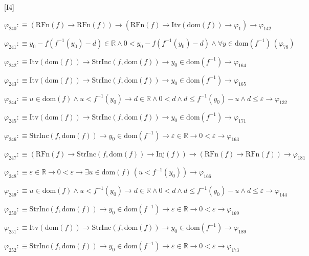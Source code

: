 \begin{fullproof}{[I4]}
\begin{abbrevlist}
\item $\varphi_{240} :\equiv (\mathrm{RFn}(f) \to \mathrm{RFn}(f)) \to (\mathrm{RFn}(f) \to \mathrm{Itv}(\mathrm{dom}(f)) \to \varphi_{1}) \to \varphi_{142}$
\item $\varphi_{241} :\equiv y_{0} - f(f^{-1}(y_{0}) - d) \in \mathbb{R} \land 0 < y_{0} - f(f^{-1}(y_{0}) - d) \land \forall y \in \mathrm{dom}(f^{-1})\,(\varphi_{78})$
\item $\varphi_{242} :\equiv \mathrm{Itv}(\mathrm{dom}(f)) \to \mathrm{StrInc}(f,\mathrm{dom}(f)) \to y_{0} \in \mathrm{dom}(f^{-1}) \to \varphi_{164}$
\item $\varphi_{243} :\equiv \mathrm{Itv}(\mathrm{dom}(f)) \to \mathrm{StrInc}(f,\mathrm{dom}(f)) \to y_{0} \in \mathrm{dom}(f^{-1}) \to \varphi_{165}$
\item $\varphi_{244} :\equiv u \in \mathrm{dom}(f) \land u < f^{-1}(y_{0}) \to d \in \mathbb{R} \land 0 < d \land d \leq f^{-1}(y_{0}) - u \land d \leq \varepsilon \to \varphi_{132}$
\item $\varphi_{245} :\equiv \mathrm{Itv}(\mathrm{dom}(f)) \to \mathrm{StrInc}(f,\mathrm{dom}(f)) \to y_{0} \in \mathrm{dom}(f^{-1}) \to \varphi_{171}$
\item $\varphi_{246} :\equiv \mathrm{StrInc}(f,\mathrm{dom}(f)) \to y_{0} \in \mathrm{dom}(f^{-1}) \to \varepsilon \in \mathbb{R} \to 0 < \varepsilon \to \varphi_{163}$
\item $\varphi_{247} :\equiv (\mathrm{RFn}(f) \to \mathrm{StrInc}(f,\mathrm{dom}(f)) \to \mathrm{Inj}(f)) \to (\mathrm{RFn}(f) \to \mathrm{RFn}(f)) \to \varphi_{181}$
\item $\varphi_{248} :\equiv \varepsilon \in \mathbb{R} \to 0 < \varepsilon \to \exists u \in \mathrm{dom}(f)\,(u < f^{-1}(y_{0})) \to \varphi_{166}$
\item $\varphi_{249} :\equiv u \in \mathrm{dom}(f) \land u < f^{-1}(y_{0}) \to d \in \mathbb{R} \land 0 < d \land d \leq f^{-1}(y_{0}) - u \land d \leq \varepsilon \to \varphi_{144}$
\item $\varphi_{250} :\equiv \mathrm{StrInc}(f,\mathrm{dom}(f)) \to y_{0} \in \mathrm{dom}(f^{-1}) \to \varepsilon \in \mathbb{R} \to 0 < \varepsilon \to \varphi_{169}$
\item $\varphi_{251} :\equiv \mathrm{Itv}(\mathrm{dom}(f)) \to \mathrm{StrInc}(f,\mathrm{dom}(f)) \to y_{0} \in \mathrm{dom}(f^{-1}) \to \varphi_{189}$
\item $\varphi_{252} :\equiv \mathrm{StrInc}(f,\mathrm{dom}(f)) \to y_{0} \in \mathrm{dom}(f^{-1}) \to \varepsilon \in \mathbb{R} \to 0 < \varepsilon \to \varphi_{173}$

\end{abbrevlist}
\end{fullproof}
